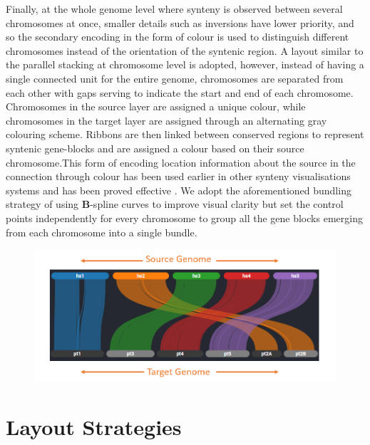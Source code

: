 Finally, at the whole genome level where synteny is observed between several chromosomes at once, smaller details such as inversions have lower priority, and so the secondary encoding in the form of colour is used to distinguish different chromosomes instead of the orientation of the syntenic region. A layout similar to the parallel stacking at chromosome level is adopted, however, instead of having a single connected unit for the entire genome, chromosomes are separated from each other with gaps serving to indicate the start and end of each chromosome. Chromosomes in the source layer are assigned a unique colour, while chromosomes in the target layer are assigned through an alternating gray colouring scheme. Ribbons are then linked between conserved regions to represent syntenic gene-blocks and are assigned a colour based on their source chromosome.This form of encoding location information about the source in the connection through colour has been used earlier in other synteny visualisations systems and has been proved effective \cite{Meyer2009}. We adopt the aforementioned bundling strategy of using \textbf{B}-spline curves\cite{ref851370272} to improve visual clarity but set the control points independently for every chromosome to group all the gene blocks emerging from each chromosome into a single bundle.


\begin{figure}[ht]
  \centering
  \includegraphics[width=.75\linewidth]{images/ch_4_genome_level.PNG}
  \label{fig:ch_4_genome_level}
\end{figure}



\section{Layout Strategies}


